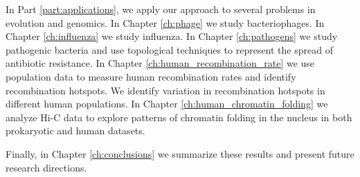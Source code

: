 In Part \ref{part:applications}, we apply our approach to several problems in evolution and genomics.
In Chapter \ref{ch:phage} we study bacteriophages.
In Chapter \ref{ch:influenza} we study influenza.
In Chapter \ref{ch:pathogens} we study pathogenic bacteria and use topological techniques to represent the spread of antibiotic resistance.
In Chapter \ref{ch:human_recombination_rate} we use population data to measure human recombination rates and identify recombination hotspots.
We identify variation in recombination hotspots in different human populations.
In Chapter \ref{ch:human_chromatin_folding} we analyze Hi-C data to explore patterns of chromatin folding in the nucleus in both prokaryotic and human datasets.

Finally, in Chapter \ref{ch:conclusions} we summarize these results and present future research directions.